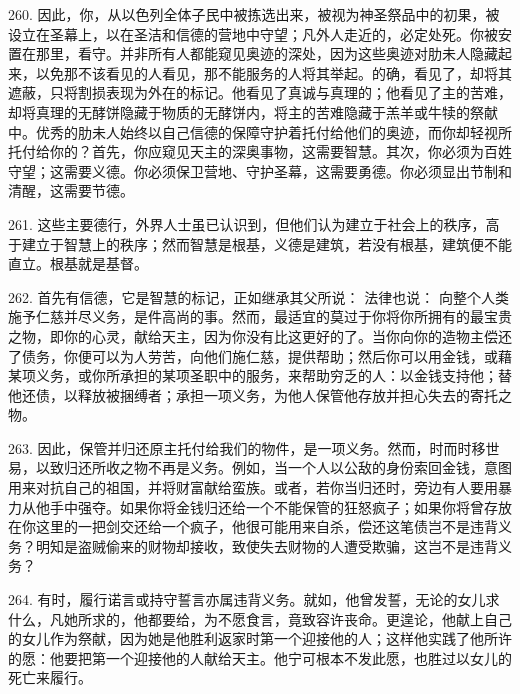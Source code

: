 260. 因此，你，从以色列全体子民中被拣选出来，被视为神圣祭品中的初果，被设立在圣幕上，以在圣洁和信德的营地中守望；凡外人走近的，必定处死。你被安置在那里，看守。并非所有人都能窥见奥迹的深处，因为这些奥迹对肋未人隐藏起来，以免那不该看见的人看见，那不能服务的人将其举起。的确，看见了，却将其遮蔽，只将割损表现为外在的标记。他看见了真诚与真理的；他看见了主的苦难，却将真理的无酵饼隐藏于物质的无酵饼内，将主的苦难隐藏于羔羊或牛犊的祭献中。优秀的肋未人始终以自己信德的保障守护着托付给他们的奥迹，而你却轻视所托付给你的？首先，你应窥见天主的深奥事物，这需要智慧。其次，你必须为百姓守望；这需要义德。你必须保卫营地、守护圣幕，这需要勇德。你必须显出节制和清醒，这需要节德。\par

261. 这些主要德行，外界人士虽已认识到，但他们认为建立于社会上的秩序，高于建立于智慧上的秩序；然而智慧是根基，义德是建筑，若没有根基，建筑便不能直立。根基就是基督。\par

262. 首先有信德，它是智慧的标记，正如继承其父所说： 法律也说：  向整个人类施予仁慈并尽义务，是件高尚的事。然而，最适宜的莫过于你将你所拥有的最宝贵之物，即你的心灵，献给天主，因为你没有比这更好的了。当你向你的造物主偿还了债务，你便可以为人劳苦，向他们施仁慈，提供帮助；然后你可以用金钱，或藉某项义务，或你所承担的某项圣职中的服务，来帮助穷乏的人：以金钱支持他；替他还债，以释放被捆缚者；承担一项义务，为他人保管他存放并担心失去的寄托之物。\par

263. 因此，保管并归还原主托付给我们的物件，是一项义务。然而，时而时移世易，以致归还所收之物不再是义务。例如，当一个人以公敌的身份索回金钱，意图用来对抗自己的祖国，并将财富献给蛮族。或者，若你当归还时，旁边有人要用暴力从他手中强夺。如果你将金钱归还给一个不能保管的狂怒疯子；如果你将曾存放在你这里的一把剑交还给一个疯子，他很可能用来自杀，偿还这笔债岂不是违背义务？明知是盗贼偷来的财物却接收，致使失去财物的人遭受欺骗，这岂不是违背义务？\par

264. 有时，履行诺言或持守誓言亦属违背义务。就如，他曾发誓，无论的女儿求什么，凡她所求的，他都要给，为不愿食言，竟致容许丧命。更遑论，他献上自己的女儿作为祭献，因为她是他胜利返家时第一个迎接他的人；这样他实践了他所许的愿：他要把第一个迎接他的人献给天主。他宁可根本不发此愿，也胜过以女儿的死亡来履行。\par

